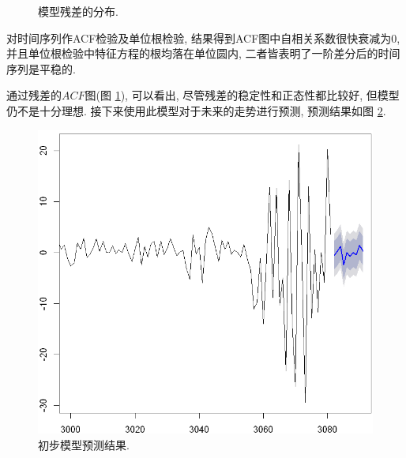 \documentclass[11pt]{article}
\begin{document}
\begin{center}
\begin{minipage}{0.45\textwidth}
\begin{figure}
            \caption{模型残差的分布.\label{fig:6}}
        \end{figure}
    \end{minipage}
\end{center}

\qquad 对时间序列作ACF检验及单位根检验, 结果得到ACF图中自相关系数很快衰减为0, 并且单位根检验中特征方程的根均落在单位圆内, 二者皆表明了一阶差分后的时间序列是平稳的.  

\qquad 通过残差的$ACF$图(图 \ref{fig:6}), 可以看出, 尽管残差的稳定性和正态性都比较好, 但模型仍不是十分理想. 接下来使用此模型对于未来的走势进行预测, 预测结果如图 \ref{fig:7}.
\begin{figure}
    \centering
    \includegraphics[width=.4\textwidth]{output_18_0}
    \caption{初步模型预测结果. \label{fig:7}}
\end{figure}
\end{document}
